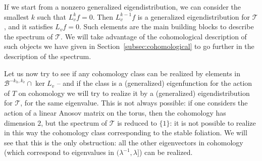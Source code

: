 \documentclass[JEP,XML,SOM,Unicode]{cedram}
\newcommand{\boB}{\mathcal{B}}
\newcommand{\boT}{\mathcal{T}}
\theoremstyle{definition}
\numberwithin{equation}{section}
\begin{document}
If we start from a nonzero generalized eigendistribution, we can consider the
smallest $k$ such that $L_v^k f = 0$. Then $L_v^{k-1} f$ is a generalized
eigendistribution for $\boT$, and it satisfies $L_v f = 0$. Such elements are
the main building blocks to describe the spectrum of $\boT$. We will take
advantage of the cohomological description of such objects we have given in
Section~\ref{subsec:cohomological} to go further in the description of the
spectrum.

Let us now try to see if any cohomology class can be realized by elements in
$\boB^{-k_h, k_v} \cap \ker L_v$ -- and if the class is a (generalized)
eigenfunction for the action of $T$ on cohomology we will try to realize it
by a (generalized) eigendistribution for $\boT$, for the same eigenvalue.
This is not always possible: if one considers the action of a linear Anosov
matrix on the torus, then the cohomology has dimension $2$, but the spectrum
of $\boT$ is reduced to $\{1\}$: it is not possible to realize in this way
the cohomology class corresponding to the stable foliation. We will see that
this is the only obstruction: all the other eigenvectors in cohomology (which
correspond to eigenvalues in $(\lambda^{-1}, \lambda]$) can be realized.
\end{document}
